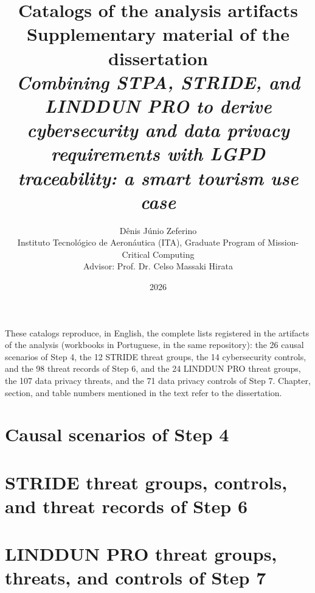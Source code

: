 \documentclass[11pt,a4paper]{report}
\title{Catalogs of the analysis artifacts\\[1ex]\large Supplementary material of the dissertation\\ \emph{Combining STPA, STRIDE, and LINDDUN PRO to derive cybersecurity and data privacy requirements with LGPD traceability: a smart tourism use case}}
\author{D\^enis J\'unio Zeferino\\ Instituto Tecnol\'ogico de Aeron\'autica (ITA), Graduate Program of Mission-Critical Computing\\ Advisor: Prof. Dr. Celso Massaki Hirata}
\date{2026}
\begin{document}
\maketitle
\tableofcontents
\vspace{2em}
\noindent These catalogs reproduce, in English, the complete lists registered in the artifacts of the analysis (workbooks in Portuguese, in the same repository): the 26 causal scenarios of Step 4, the 12 STRIDE threat groups, the 14 cybersecurity controls, and the 98 threat records of Step 6, and the 24 LINDDUN PRO threat groups, the 107 data privacy threats, and the 71 data privacy controls of Step 7. Chapter, section, and table numbers mentioned in the text refer to the dissertation.
\chapter{Causal scenarios of Step 4}

\chapter{STRIDE threat groups, controls, and threat records of Step 6}

\chapter{LINDDUN PRO threat groups, threats, and controls of Step 7}

\end{document}
